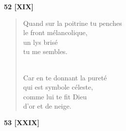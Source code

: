 \documentclass[a4paper,11pt]{book}
\begin{document}
\bigskip

\begin{center} {\bf 52 [XIX]} \end{center}

\begin{verse}
Quand sur la poitrine tu penches \\
le front mélancolique, \\
un lys brisé \\
tu me sembles. \\ \

Car en te donnant la pureté \\
qui est symbole céleste, \\
comme lui te fit Dieu \\
d'or et de neige. \\
\end{verse}

\newpage

\begin{center} {\bf 53 [XXIX]} \end{center}
\end{document}

